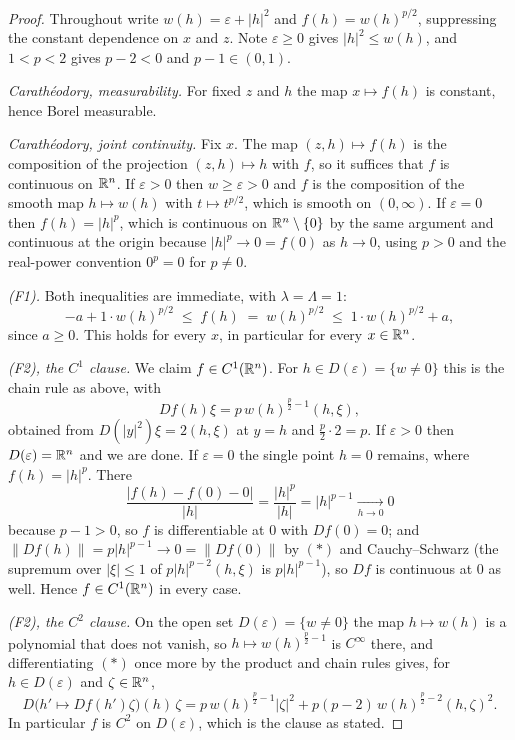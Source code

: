\begin{proof}
Throughout write $w(h)=\varepsilon+|h|^2$ and $f(h)=w(h)^{p/2}$, suppressing the
constant dependence on $x$ and $z$.  Note $\varepsilon\ge0$ gives
$|h|^2\le w(h)$, and $1<p<2$ gives $p-2<0$ and $p-1\in(0,1)$.

\emph{Carath\'eodory, measurability.}  For fixed $z$ and $h$ the map
$x\mapsto f(h)$ is constant, hence Borel measurable.

\emph{Carath\'eodory, joint continuity.}  Fix $x$.  The map
$(z,h)\mapsto f(h)$ is the composition of the projection $(z,h)\mapsto h$ with
$f$, so it suffices that $f$ is continuous on $\mathbb{R}^n$.  If $\varepsilon>0$ then
$w\ge\varepsilon>0$ and $f$ is the composition of the smooth map $h\mapsto w(h)$
with $t\mapsto t^{p/2}$, which is smooth on $(0,\infty)$.  If $\varepsilon=0$
then $f(h)=|h|^{p}$, which is continuous on $\mathbb{R}^n\setminus\{0\}$ by the same
argument and continuous at the origin because $|h|^p\to0=f(0)$ as $h\to0$, using
$p>0$ and the real-power convention $0^{p}=0$ for $p\ne0$.

\emph{(F1).}  Both inequalities are immediate, with $\lambda=\Lambda=1$:
\[
-a+1\cdot w(h)^{p/2}\;\le\;f(h)\;=\;w(h)^{p/2}\;\le\;1\cdot w(h)^{p/2}+a ,
\]
since $a\ge0$.  This holds for every $x$, in particular for every $x\in\mathbb{R}^n$.

\emph{(F2), the $C^1$ clause.}  We claim $f\in C^1(\mathbb{R}^n)$.  For
$h\in D(\varepsilon)=\{w\ne0\}$ this is the chain rule as above, with
\begin{equation}
Df(h)\xi=p\,w(h)^{\frac p2-1}(h,\xi),
\tag{$\ast$}
\end{equation}
obtained from $D(|y|^2)\xi=2(h,\xi)$ at $y=h$ and $\frac p2\cdot2=p$.  If
$\varepsilon>0$ then $D(\varepsilon)=\mathbb{R}^n$ and we are done.  If
$\varepsilon=0$ the single point $h=0$ remains, where $f(h)=|h|^p$.  There
\[
\frac{|f(h)-f(0)-0|}{|h|}=\frac{|h|^p}{|h|}=|h|^{p-1}\xrightarrow[h\to0]{}0
\]
because $p-1>0$, so $f$ is differentiable at $0$ with $Df(0)=0$; and
$\|Df(h)\|=p|h|^{p-1}\to0=\|Df(0)\|$ by $(\ast)$ and Cauchy--Schwarz (the
supremum over $|\xi|\le1$ of $p|h|^{p-2}(h,\xi)$ is $p|h|^{p-1}$), so $Df$ is
continuous at $0$ as well.  Hence $f\in C^1(\mathbb{R}^n)$ in every case.

\emph{(F2), the $C^2$ clause.}  On the open set $D(\varepsilon)=\{w\ne0\}$ the
map $h\mapsto w(h)$ is a polynomial that does not vanish, so
$h\mapsto w(h)^{\frac p2-1}$ is $C^\infty$ there, and differentiating $(\ast)$
once more by the product and chain rules gives, for $h\in D(\varepsilon)$ and
$\zeta\in\mathbb{R}^n$,
\begin{equation}
D\bigl(h'\mapsto Df(h')\zeta\bigr)(h)\,\zeta
= p\,w(h)^{\frac p2-1}|\zeta|^2
  + p(p-2)\,w(h)^{\frac p2-2}(h,\zeta)^2 .
\tag{$\ast\ast$}
\end{equation}
In particular $f$ is $C^2$ on $D(\varepsilon)$, which is the clause as stated.


\end{proof}
